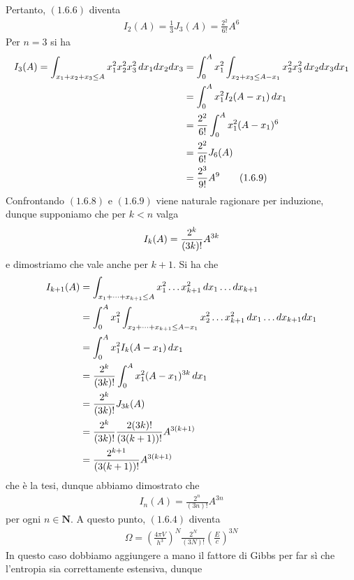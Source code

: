 \documentclass{article}
\begin{document}
Pertanto, $(1.6.6)$ diventa
\begin{align}
    I_2(A) = \frac{1}{3}J_3(A) = \frac{2^2}{6!}A^6 \tag{1.6.8}
\end{align}
Per $n = 3$ si ha
\begin{align}
    I_3(A) = \int_{x_1 + x_2 + x_3 \leq A}x^2_1x^2_2x^2_3 \, dx_1dx_2dx_3 &= \int_0^A x^2_1 \int_{x_2 + x_3 \leq A - x_1}x^2_2x^2_3 \, dx_2dx_3dx_1 \notag \\
    &= \int_0^A x^2_1I_2(A - x_1) \, dx_1 \notag \\
    &= \frac{2^2}{6!}\int_0^A x^2_1(A - x_1)^6 \notag \\
    &= \frac{2^2}{6!}J_6(A) \notag \\
    &= \frac{2^3}{9!}A^9 \tag{1.6.9}
\end{align}
Confrontando $(1.6.8)$ e $(1.6.9)$ viene naturale ragionare per induzione, dunque supponiamo che per $k < n$ valga
\begin{align}
    I_k(A) = \frac{2^k}{(3k)!}A^{3k} \notag
\end{align}
e dimostriamo che vale anche per $k + 1$. Si ha che
\begin{align}
    I_{k + 1}(A) &= \int_{x_1 + \dots +x_{k + 1} \leq A}x^2_1 \dots x^2_{k + 1} \, dx_1 \dots dx_{k + 1} \notag \\
    &= \int_0^A x^2_1 \int_{x_2 + \dots + x_{k + 1} \leq A - x_1}x^2_2 \dots x^2_{k + 1} \, dx_1 \dots dx_{k + 1}dx_1 \notag \\
    &= \int_0^A x^2_1I_k(A - x_1) \, dx_1 \notag \\
    &= \frac{2^k}{(3k)!}\int_0^A x^2_1(A - x_1)^{3k} \, dx_1 \notag \\
    &= \frac{2^k}{(3k)!}J_{3k}(A) \notag \\
    &= \frac{2^k}{(3k)!}\frac{2(3k)!}{(3(k + 1))!}A^{3(k + 1)} \notag \\
    &= \frac{2^{k + 1}}{(3(k + 1))!}A^{3(k + 1)} \notag
\end{align}
che è la tesi, dunque abbiamo dimostrato che
\begin{align}
    I_n(A) = \frac{2^n}{(3n)!}A^{3n} \tag{1.6.10}
\end{align}
per ogni $n \in \mathbf{N}$. A questo punto, $(1.6.4)$ diventa
\begin{align}
    \Omega = \left(\frac{4\pi V}{h^3}\right)^N\frac{2^N}{(3N)!}\left(\frac{E}{c}\right)^{3N} \tag{1.6.11}
\end{align}
In questo caso dobbiamo aggiungere a mano il fattore di Gibbs per far sì che l'entropia sia correttamente estensiva, dunque
\end{document}
